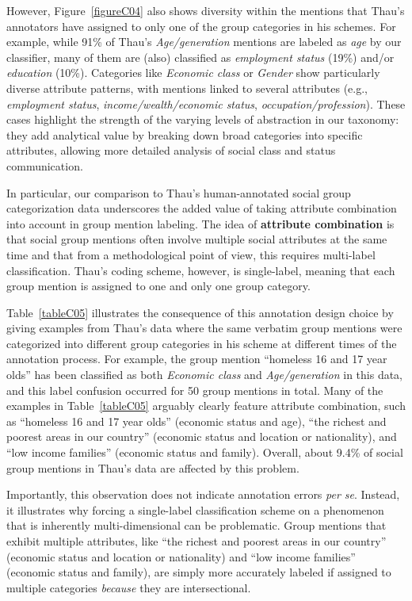 \documentclass[12pt]{article}
\begin{document}
However, Figure~\ref{figureC04} also shows diversity within the mentions that Thau's annotators have assigned to only one of the group categories in his schemes.
For example, while 91\% of Thau's \emph{Age/generation} mentions are labeled as \emph{age} by our classifier, many of them are (also) classified as \emph{employment status} (19\%) and/or \emph{education} (10\%).
Categories like \emph{Economic class} or \emph{Gender} show particularly diverse attribute patterns, with mentions linked to several attributes (e.g., \emph{employment status}, \emph{income/wealth/economic status}, \emph{occupation/profession}).
These cases highlight the strength of the varying levels of abstraction in our taxonomy: they add analytical value by breaking down broad categories into specific attributes, allowing more detailed analysis of social class and status communication.

%

In particular, our comparison to Thau's human-annotated social group categorization data underscores the added value of taking attribute combination into account in group mention labeling.
The idea of \textbf{attribute combination} is that social group mentions often involve multiple social attributes at the same time and that from a methodological point of view, this requires multi-label classification.
Thau's coding scheme, however, is single-label, meaning that each group mention is assigned to one and only one group category.

Table~\ref{tableC05} illustrates the consequence of this annotation design choice by giving examples from Thau's data where the same verbatim group mentions were categorized into different group categories in his scheme at different times of the annotation process.
For example, the group mention ``homeless 16 and 17 year olds'' has been classified as both \emph{Economic class} and \emph{Age/generation} in this data, and this label confusion occurred for 50 group mentions in total.
Many of the examples in Table~\ref{tableC05} arguably clearly feature attribute combination, such as ``homeless 16 and 17 year olds'' (economic status and age), ``the richest and poorest areas in our country'' (economic status and location or nationality), and ``low income families'' (economic status and family).
Overall, about 9.4\% of social group mentions in Thau's data are affected by this problem.

Importantly, this observation does not indicate annotation errors \emph{per se}.
Instead, it illustrates why forcing a single-label classification scheme on a phenomenon that is inherently multi-dimensional can be problematic.
Group mentions that exhibit multiple attributes, like ``the richest and poorest areas in our country'' (economic status and location or nationality) and ``low income families'' (economic status and family), are simply more accurately labeled if assigned to multiple categories \emph{because} they are intersectional.
\end{document}
